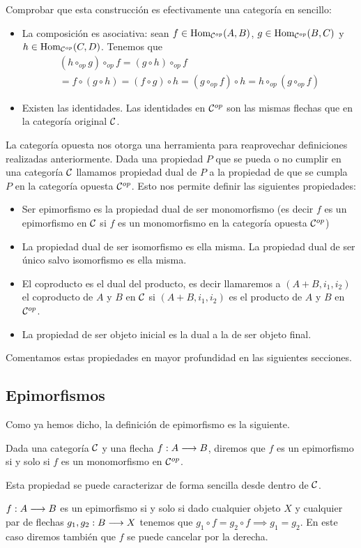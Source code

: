 Comprobar que esta construcción es efectivamente una categoría
en sencillo:
\begin{itemize}
\item La composición es asociativa: sean
$f \in \operatorname{Hom}_{\mathcal{C}^{op}}(A, B)$, $g \in \operatorname{Hom}_{\mathcal{C}^{op}}(B, C)$
y $h \in \operatorname{Hom}_{\mathcal{C}^{op}}(C, D)$. Tenemos que
\begin{multline*}
(h \circ_{op} g) \circ_{op} f = (g \circ h) \circ_{op} f \\
= f \circ (g \circ h)
= (f \circ g) \circ h
= (g \circ_{op} f)  \circ h
= h \circ_{op} (g \circ_{op} f)
\end{multline*}
\item Existen las identidades. Las identidades en $\mathcal{C}^{op}$
son las mismas flechas que en la categoría original $\mathcal{C}$.
\end{itemize}

La categoría opuesta nos otorga una herramienta para reaprovechar
definiciones realizadas anteriormente. Dada una propiedad $P$ que
se pueda o no cumplir en una categoría $\mathcal{C}$ llamamos propiedad
dual de $P$ a la propiedad de que se cumpla $P$ en la categoría opuesta
$\mathcal{C}^{op}$. Esto nos permite definir las siguientes propiedades:

\begin{itemize}
\item Ser epimorfismo es la propiedad dual de ser monomorfismo (es decir
$f$ es un epimorfismo en $\mathcal{C}$ si $f$ es un monomorfismo en la categoría opuesta
$\mathcal{C}^{op}$)
\item La propiedad dual de ser isomorfismo es ella misma. La propiedad
dual de ser único salvo isomorfismo es ella misma.
\item El coproducto es el dual del producto, es decir llamaremos
a $(A+B, i_1, i_2)$ el coproducto de $A$ y $B$ en $\mathcal{C}$ si
$(A+B, i_1, i_2)$ es el producto de $A$ y $B$ en $\mathcal{C}^{op}$.
\item La propiedad de ser objeto inicial es la dual a la de ser objeto final.
\end{itemize}

Comentamos estas propiedades en mayor profundidad en las siguientes
secciones.

\subsection{Epimorfismos}
Como ya hemos dicho, la definición de epimorfismo es la siguiente.
\begin{definition}
Dada una categoría $\mathcal{C}$ y una flecha $f: A\longrightarrow B$, diremos que
$f$ es un epimorfismo si y solo si $f$ es un monomorfismo en
$\mathcal{C}^{op}$.
\end{definition}
Esta propiedad
se puede caracterizar de forma sencilla desde dentro de $\mathcal{C}$.
\begin{proposition}
$f: A\longrightarrow B$ es un epimorfismo si y solo si dado cualquier objeto $X$ y
cualquier par de flechas $g_1, g_2 : B\longrightarrow X$
tenemos que $g_1 \circ f = g_2 \circ f \implies g_1 = g_2$.
En este caso diremos también que $f$ se puede cancelar por la
derecha.
\end{proposition}

